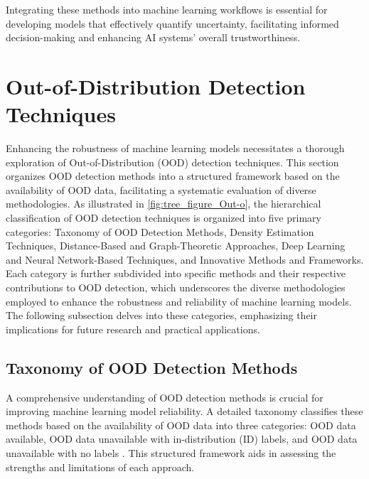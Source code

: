 Integrating these methods into machine learning workflows is essential for developing models that effectively quantify uncertainty, facilitating informed decision-making and enhancing AI systems' overall trustworthiness.











\section{Out-of-Distribution Detection Techniques} \label{sec:Out-of-Distribution Detection Techniques}


Enhancing the robustness of machine learning models necessitates a thorough exploration of Out-of-Distribution (OOD) detection techniques. This section organizes OOD detection methods into a structured framework based on the availability of OOD data, facilitating a systematic evaluation of diverse methodologies. As illustrated in \autoref{fig:tree_figure_Out-o}, the hierarchical classification of OOD detection techniques is organized into five primary categories: Taxonomy of OOD Detection Methods, Density Estimation Techniques, Distance-Based and Graph-Theoretic Approaches, Deep Learning and Neural Network-Based Techniques, and Innovative Methods and Frameworks. Each category is further subdivided into specific methods and their respective contributions to OOD detection, which underscores the diverse methodologies employed to enhance the robustness and reliability of machine learning models. The following subsection delves into these categories, emphasizing their implications for future research and practical applications.





\subsection{Taxonomy of OOD Detection Methods} \label{subsec:Taxonomy of OOD Detection Methods}

A comprehensive understanding of OOD detection methods is crucial for improving machine learning model reliability. A detailed taxonomy classifies these methods based on the availability of OOD data into three categories: OOD data available, OOD data unavailable with in-distribution (ID) labels, and OOD data unavailable with no labels \cite{lang2023survey}. This structured framework aids in assessing the strengths and limitations of each approach.

